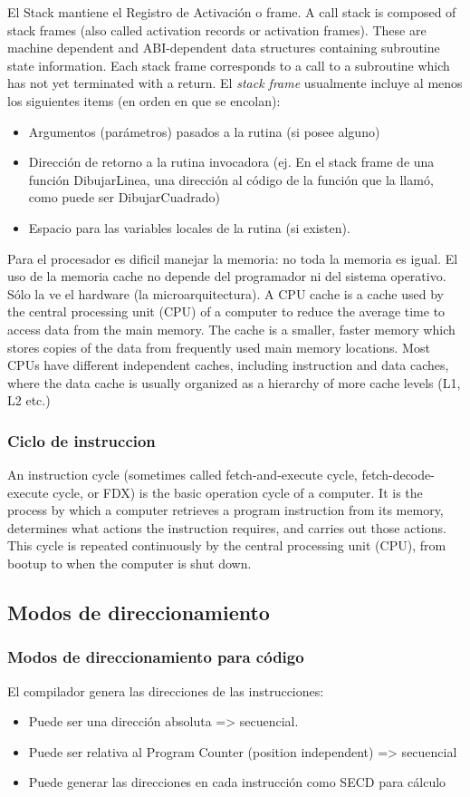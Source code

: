 \documentclass[a4paper, twoside]{article}
\begin{document}
El Stack mantiene el Registro de Activación o frame. A call stack is composed of stack frames (also called activation records or activation frames). These are machine dependent and ABI-dependent data structures containing subroutine state information. Each stack frame corresponds to a call to a subroutine which has not yet terminated with a return.
El \emph{stack frame} usualmente incluye al menos los siguientes items (en orden en que se encolan):
\begin{itemize}
	\item Argumentos (parámetros) pasados a la rutina (si posee alguno)
	\item Dirección de retorno a la rutina invocadora (ej. En el stack frame de una función DibujarLinea, una dirección al código de la función que la llamó, como puede ser DibujarCuadrado)
	\item Espacio para las variables locales de la rutina (si existen).
\end{itemize}
Para el procesador es dificil manejar la memoria: no toda la memoria es igual.
El uso de la memoria cache no depende del programador ni del sistema operativo. Sólo la ve el hardware (la microarquitectura).
A CPU cache is a cache used by the central processing unit (CPU) of a computer to reduce the average time to access data from the main memory. The cache is a smaller, faster memory which stores copies of the data from frequently used main memory locations. Most CPUs have different independent caches, including instruction and data caches, where the data cache is usually organized as a hierarchy of more cache levels (L1, L2 etc.)

\subsubsection{Ciclo de instruccion}
An instruction cycle (sometimes called fetch-and-execute cycle, fetch-decode-execute cycle, or FDX) is the basic operation cycle of a computer. It is the process by which a computer retrieves a program instruction from its memory, determines what actions the instruction requires, and carries out those actions. This cycle is repeated continuously by the central processing unit (CPU), from bootup to when the computer is shut down.

\subsection{Modos de direccionamiento}

\subsubsection{Modos de direccionamiento para código}
El compilador genera las direcciones de las instrucciones:
\begin{itemize}
	\item Puede ser una dirección absoluta => secuencial.
	\item Puede ser relativa al Program Counter (position independent) => secuencial
	\item Puede generar las direcciones en cada instrucción como SECD para cálculo
\end{itemize}
\end{document}
